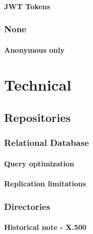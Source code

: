 \hypertarget{jwt-tokens}{%
\paragraph{JWT Tokens}\label{jwt-tokens}}

\hypertarget{none}{%
\subsubsection{None}\label{none}}

\hypertarget{anonymous-only}{%
\paragraph{Anonymous only}\label{anonymous-only}}

\hypertarget{technical}{%
\section{Technical}\label{technical}}

\hypertarget{repositories}{%
\subsection{Repositories}\label{repositories}}

\hypertarget{relational-database}{%
\subsubsection{Relational Database}\label{relational-database}}

\hypertarget{query-optimization}{%
\paragraph{Query optimization}\label{query-optimization}}

\hypertarget{replication-limitations}{%
\paragraph{Replication limitations}\label{replication-limitations}}

\hypertarget{directories}{%
\subsubsection{Directories}\label{directories}}

\hypertarget{historical-note---x.500}{%
\paragraph{Historical note - X.500}\label{historical-note---x.500}}


